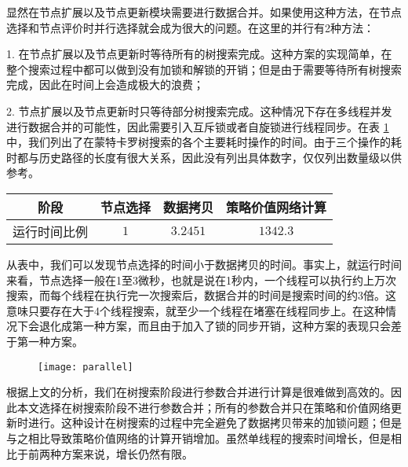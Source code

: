 显然在节点扩展以及节点更新模块需要进行数据合并。如果使用这种方法，在节点选择和节点评价时并行选择就会成为很大的问题。在这里的并行有2种方法：

1. 在节点扩展以及节点更新时等待所有的树搜索完成。这种方案的实现简单，在整个搜索过程中都可以做到没有加锁和解锁的开销；但是由于需要等待所有树搜索完成，因此在时间上会造成极大的浪费；

2. 节点扩展以及节点更新时只等待部分树搜索完成。这种情况下存在多线程并发进行数据合并的可能性，因此需要引入互斥锁或者自旋锁进行线程同步。在表 \ref{tab:MCTS_runtime} 中，我们列出了在蒙特卡罗树搜索的各个主要耗时操作的时间。由于三个操作的耗时都与历史路径的长度有很大关系，因此没有列出具体数字，仅仅列出数量级以供参考。

\begin{table}[H]
    \label{tab:MCTS_runtime}
    \centering
    \footnotesize%
    \setlength{\tabcolsep}{4pt}%
    \renewcommand{\arraystretch}{1.2}%
    \begin{tabular}{cccc}
        \hline
        阶段 & 节点选择 & 数据拷贝 & 策略价值网络计算 \\
        \hline
        运行时间比例 & $1$ & $3.2451$ & $1342.3$ \\
        \hline
    \end{tabular}
\end{table}

从表中，我们可以发现节点选择的时间小于数据拷贝的时间。事实上，就运行时间来看，节点选择一般在1至3微秒，也就是说在1秒内，一个线程可以执行约上万次搜索，而每个线程在执行完一次搜索后，数据合并的时间是搜索时间的约3倍。这意味只要存在大于4个线程搜索，就至少一个线程在堵塞在线程同步上。在这种情况下会退化成第一种方案，而且由于加入了锁的同步开销，这种方案的表现只会差于第一种方案。

\begin{figure}[!htbp]
    \centering
    \texttt{[image: parallel]}
    \label{fig:tensorflow_para}
\end{figure}

根据上文的分析，我们在树搜索阶段进行参数合并进行计算是很难做到高效的。因此本文选择在树搜索阶段不进行参数合并；所有的参数合并只在策略和价值网络更新时进行。这种设计在树搜索的过程中完全避免了数据拷贝带来的加锁问题；但是与之相比导致策略价值网络的计算开销增加。虽然单线程的搜索时间增长，但是相比于前两种方案来说，增长仍然有限。

